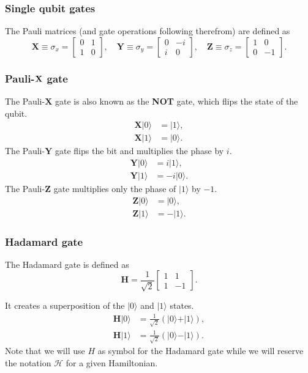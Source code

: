 \documentclass{beamer}
\begin{document}
\begin{frame}
\frametitle{Single qubit gates}

The Pauli matrices (and gate operations following therefrom) are defined as
\[
	\bm{X} \equiv \sigma_x = \begin{bmatrix}
		0 & 1 \\
		1 & 0
	\end{bmatrix}, \quad
	\bm{Y} \equiv \sigma_y = \begin{bmatrix}
		0 & -i \\
		i & 0
	\end{bmatrix}, \quad
	\bm{Z} \equiv \sigma_z = \begin{bmatrix}
		1 & 0 \\
		0 & -1
	\end{bmatrix}.
\]
\end{frame}

\begin{frame}
\frametitle{Pauli-${\bf X}$ gate}

The Pauli-$\bm{X}$ gate is also known as the \textbf{NOT} gate, which flips the state of the qubit.
\begin{align*}
	\bm{X}\vert 0\rangle &= \vert 1\rangle, \\
	\bm{X}\vert 1\rangle &= \vert 0\rangle.	
\end{align*}
The Pauli-$\bm{Y}$ gate flips the bit and multiplies the phase by $ i $. 
\begin{align*}
	\bm{Y}\vert 0\rangle &= i\vert 1\rangle, \\
	\bm{Y}\vert 1\rangle &= -i\vert 0\rangle.
\end{align*}
The Pauli-$\bm{Z}$ gate multiplies only the phase of $\vert 1\rangle$ by $ -1 $.
\begin{align*}
	\bm{Z}\vert 0\rangle &= \vert 0\rangle, \\
	\bm{Z}\vert 1\rangle &= -\vert 1\rangle.
\end{align*}
\end{frame}

\begin{frame}
\frametitle{Hadamard gate}

The Hadamard gate is defined as
\[
	\bm{H} = \frac{1}{\sqrt{2}} \begin{bmatrix}
		1 & 1 \\
		1 & -1
	\end{bmatrix}.
\]

It creates a superposition of the $ \vert 0\rangle $ and $ \vert 1\rangle $ states.
\begin{align}
	\bm{H}\vert 0\rangle &= \frac{1}{\sqrt{2}} \left( \vert 0\rangle + \vert 1\rangle \right), \\
	\bm{H}\vert 1\rangle &= \frac{1}{\sqrt{2}} \left( \vert 0\rangle - \vert 1\rangle \right).
\end{align}
Note that we will use $H$ as symbol for the Hadamard gate while we will reserve the notation $\mathcal{H}$ for a given Hamiltonian.
\end{frame}
\end{document}

